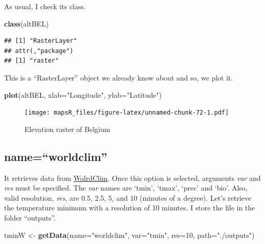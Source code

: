 \documentclass[]{report}
\newenvironment{Shaded}{\begin{snugshade}}{\end{snugshade}}
\newcommand{\DataTypeTok}[1]{\textcolor[rgb]{0.13,0.29,0.53}{#1}}
\newcommand{\DecValTok}[1]{\textcolor[rgb]{0.00,0.00,0.81}{#1}}
\newcommand{\KeywordTok}[1]{\textcolor[rgb]{0.13,0.29,0.53}{\textbf{#1}}}
\newcommand{\NormalTok}[1]{#1}
\newcommand{\StringTok}[1]{\textcolor[rgb]{0.31,0.60,0.02}{#1}}
\begin{document}
As usual, I check its class.

\begin{Shaded}
\begin{Highlighting}[]
\KeywordTok{class}\NormalTok{(altBEL)}
\end{Highlighting}
\end{Shaded}

\begin{verbatim}
## [1] "RasterLayer"
## attr(,"package")
## [1] "raster"
\end{verbatim}

This is a ``RasterLayer'' object we already know about and so, we plot
it.

\begin{Shaded}
\begin{Highlighting}[]
\KeywordTok{plot}\NormalTok{(altBEL, }\DataTypeTok{xlab=}\StringTok{"Longitude"}\NormalTok{, }\DataTypeTok{ylab=}\StringTok{"Latitude"}\NormalTok{)}
\end{Highlighting}
\end{Shaded}

\begin{figure}
\centering
\texttt{[image: mapsR\_files/figure-latex/unnamed-chunk-72-1.pdf]}
\caption{Elevation raster of Belgium}
\end{figure}

\hypertarget{nameworldclim}{%
\subsection{name=``worldclim''}\label{nameworldclim}}

It retrieves data from \href{http://worldclim.org}{WolrdClim}. Once this
option is selected, arguments \emph{var} and \emph{res} must be
specified. The \emph{var} names are `tmin', `tmax', `prec' and `bio'.
Also, valid resolution, \emph{res}, are 0.5, 2.5, 5, and 10 (minutes of
a degree). Let's retrieve the temperature minimum with a resolution of
10 minutes. I store the file in the folder ``outputs''.

\begin{Shaded}
\begin{Highlighting}[]
\NormalTok{tminW <-}\StringTok{ }\KeywordTok{getData}\NormalTok{(}\DataTypeTok{name=}\StringTok{"worldclim"}\NormalTok{, }\DataTypeTok{var=}\StringTok{"tmin"}\NormalTok{, }\DataTypeTok{res=}\DecValTok{10}\NormalTok{, }\DataTypeTok{path=}\StringTok{"./outputs"}\NormalTok{)}
\end{Highlighting}
\end{Shaded}
\end{document}
